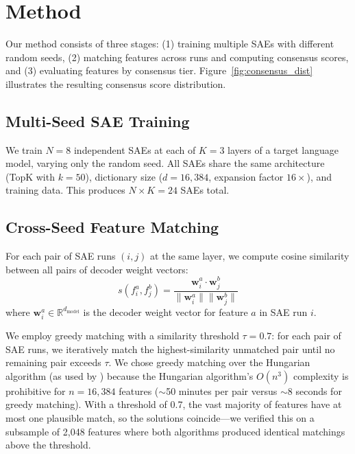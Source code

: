 \documentclass{article}
\begin{document}
\section{Method}
\label{sec:method}

Our method consists of three stages: (1) training multiple SAEs with different random seeds, (2) matching features across runs and computing consensus scores, and (3) evaluating features by consensus tier. Figure~\ref{fig:consensus_dist} illustrates the resulting consensus score distribution.

\subsection{Multi-Seed SAE Training}

We train $N = 8$ independent SAEs at each of $K = 3$ layers of a target language model, varying only the random seed. All SAEs share the same architecture (TopK with $k = 50$), dictionary size ($d = 16{,}384$, expansion factor $16\times$), and training data. This produces $N \times K = 24$ SAEs total.

\subsection{Cross-Seed Feature Matching}
\label{sec:matching}

For each pair of SAE runs $(i, j)$ at the same layer, we compute cosine similarity between all pairs of decoder weight vectors:
\begin{equation}
    s(f_i^a, f_j^b) = \frac{\mathbf{w}_i^a \cdot \mathbf{w}_j^b}{\|\mathbf{w}_i^a\| \|\mathbf{w}_j^b\|}
\end{equation}
where $\mathbf{w}_i^a \in \mathbb{R}^{d_\text{model}}$ is the decoder weight vector for feature $a$ in SAE run $i$.

We employ greedy matching with a similarity threshold $\tau = 0.7$: for each pair of SAE runs, we iteratively match the highest-similarity unmatched pair until no remaining pair exceeds $\tau$. We chose greedy matching over the Hungarian algorithm (as used by \citet{paulo2025sparse}) because the Hungarian algorithm's $O(n^3)$ complexity is prohibitive for $n = 16{,}384$ features ($\sim$50 minutes per pair versus $\sim$8 seconds for greedy matching). With a threshold of 0.7, the vast majority of features have at most one plausible match, so the solutions coincide---we verified this on a subsample of 2,048 features where both algorithms produced identical matchings above the threshold.
\end{document}
